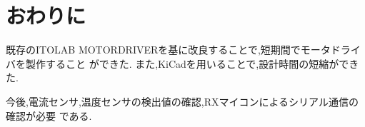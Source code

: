 \chapter{おわりに}
既存のITOLAB MOTORDRIVERを基に改良することで,短期間でモータドライバを製作すること
ができた.
また,KiCadを用いることで,設計時間の短縮ができた.

今後,電流センサ,温度センサの検出値の確認,RXマイコンによるシリアル通信の確認が必要
である.
